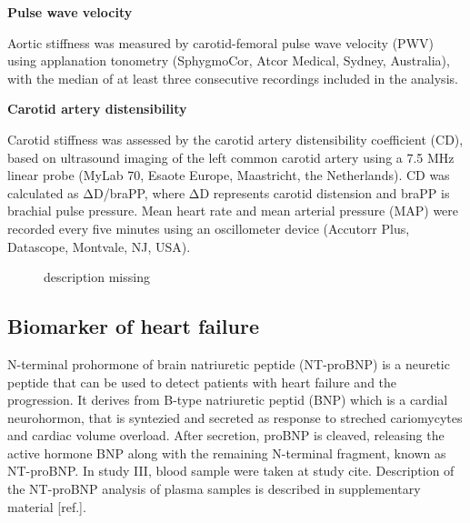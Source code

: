 \documentclass[
  a4paper,
  headsepline=true,
  open=any]{scrbook}
\begin{document}
\textbf{Pulse wave velocity}

Aortic stiffness was measured by carotid-femoral pulse wave velocity
(PWV) using applanation tonometry (SphygmoCor, Atcor Medical, Sydney,
Australia), with the median of at least three consecutive recordings
included in the analysis.

\textbf{Carotid artery distensibility}

Carotid stiffness was assessed by the carotid artery distensibility
coefficient (CD), based on ultrasound imaging of the left common carotid
artery using a 7.5 MHz linear probe (MyLab 70, Esaote Europe,
Maastricht, the Netherlands). CD was calculated as ΔD/braPP, where ΔD
represents carotid distension and braPP is brachial pulse pressure. Mean
heart rate and mean arterial pressure (MAP) were recorded every five
minutes using an oscillometer device (Accutorr Plus, Datascope,
Montvale, NJ, USA).

\begin{figure}

\begin{minipage}[t]{\linewidth}

{\centering 


\caption{description missing}

}

\end{minipage}%

\end{figure}

\hypertarget{biomarker-of-heart-failure}{%
\subsection{Biomarker of heart
failure}\label{biomarker-of-heart-failure}}

N-terminal prohormone of brain natriuretic peptide (NT-proBNP) is a
neuretic peptide that can be used to detect patients with heart failure
and the progression. It derives from B-type natriuretic peptid (BNP)
which is a cardial neurohormon, that is syntezied and secreted as
response to streched cariomycytes and cardiac volume overload. After
secretion, proBNP is cleaved, releasing the active hormone BNP along
with the remaining N-terminal fragment, known as NT-proBNP. In study
III, blood sample were taken at study cite. Description of the NT-proBNP
analysis of plasma samples is described in supplementary material
{[}ref.{]}.
\end{document}
